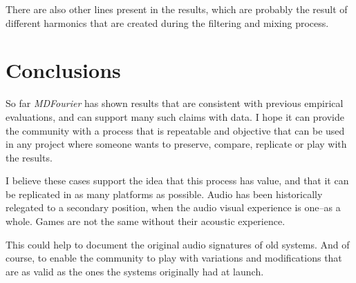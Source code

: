 \documentclass[10pt,a4paper]{report}
\begin{document}
There are also other lines present in the results, which are probably the result of different harmonics that are created during the filtering and mixing process.

\chapter{Conclusions}

So far \textit{MDFourier} has shown results that are consistent with previous empirical evaluations, and can support many such claims with data. I hope it can provide the community with a process that is repeatable and objective that can be used in any project where someone wants to preserve, compare, replicate or play with the results.

I believe these cases support the idea that this process has value, and that it can be replicated in as many platforms as possible. Audio has been historically relegated to a secondary position, when the audio visual experience is one--as a whole. Games are not the same without their acoustic experience.

This could help to document the original audio signatures of old systems. And of course, to enable the community to play with variations and modifications that are as valid as the ones the systems originally had at launch.
\end{document}
